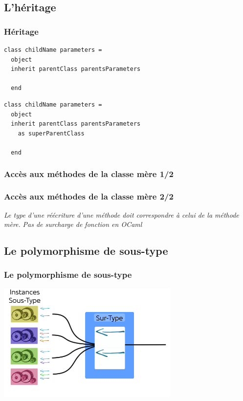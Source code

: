 \subsection{L'héritage} %
\begin{frame}[fragile]
	\frametitle{Héritage}
	\begin{lstlisting}
class childName parameters =
  object
  inherit parentClass parentsParameters

  end
	\end{lstlisting}
	\begin{lstlisting}
class childName parameters =
  object
  inherit parentClass parentsParameters
    as superParentClass

  end
	\end{lstlisting}
\end{frame}

\begin{frame}
	\frametitle{Accès aux méthodes de la classe mère 1/2}
	
\end{frame}

\begin{frame}
	\frametitle{Accès aux méthodes de la classe mère 2/2}
	\textit{Le type d'une réécriture d'une méthode doit correspondre à celui de la méthode mère.}
	\textit{Pas de surcharge de fonction en OCaml}
	
\end{frame}
\subsection{Le polymorphisme de sous-type} %
\begin{frame}
	\frametitle{Le polymorphisme de sous-type}
	\begin{center}
		\includegraphics[width=9cm]{pics/inclusionObjet.png}
	\end{center}
\end{frame}

